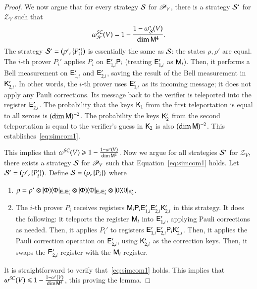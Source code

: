 \begin{proof}
	We now argue that for every strategy $\mathcal{S}$ for $\mathscr{P}_V$, there is a strategy $\mathcal{S}'$ for $\mathscr{Z}_V$ such that
	\begin{equation}
	\label{eq:simcom1}
		\omega^{SC}_{\strat'}(V) = 1 - \frac{1 - \omega^*_\strat(V)}{\dim \sM^4}.
	\end{equation}
	The strategy $\mathcal{S}' = (\rho',\{P_i'\})$ is essentially the same as $\mathcal{S}$: the states $\rho,\rho'$ are equal. The $i$-th prover $P_i'$ applies $P_i$ on ${\mathsf{E}}_{1,i}' {\mathsf{P}}_i$ (treating ${\mathsf{E}}_{1,i}'$ as ${\mathsf{M}}_i$). Then, it performs a Bell measurement on ${\mathsf{E}}_{1,i}'$ and ${\mathsf{E}}_{2,i}'$, saving the result of the Bell measurement in ${\mathsf{K}}_{2,i}'$. In other words, the $i$-th prover uses ${\mathsf{E}}_{1,i}'$ as its incoming message; it does not apply any Pauli corrections. Its message back to the verifier is teleported into the register ${\mathsf{E}}_{2,i}'$. The probability that the keys ${\mathsf{K}}_1$ from the first teleportation is equal to all zeroes is $(\dim {\mathsf{M}})^{-2}$. The probability the keys ${\mathsf{K}}_2'$ from the second teleportation is equal to the verifier's guess in ${\mathsf{K}}_2$ is also $(\dim {\mathsf{M}})^{-2}$. This establishes~\eqref{eq:simcom1}.
	
	This implies that $\omega^{SC}(V) \geqslant 1 - \frac{1 - \omega^*(V)}{\dim {\mathsf{M}}^4}$. Now we argue for all strategies $\mathcal{S}'$ for $\mathscr{Z}_{V}$, there exists a strategy $\mathcal{S}$ for $\mathscr{P}_V$ such that Equation~\eqref{eq:simcom1} holds. Let $\mathcal{S}' = (\rho',\{ P_i' \})$. Define $\mathcal{S} = (\rho,\{P_i\})$ where
	\begin{enumerate}
		\item $\rho = \rho' \otimes |\Phi\rangle\! \langle \Phi|_{{\mathsf{E}}_1 {\mathsf{E}}_1'} \otimes |\Phi\rangle\! \langle \Phi|_{{\mathsf{E}}_2 {\mathsf{E}}_2'} \otimes |0\rangle\! \langle 0|_{{\mathsf{K}}_2'}$. 
		
		\item The $i$-th prover $P_i$ receives registers ${\mathsf{M}}_i {\mathsf{P}}_i {\mathsf{E}}_{1,i}' {\mathsf{E}}_{2,i}' {\mathsf{K}}_{2,i}'$ in this strategy. It does the following: it teleports the register ${\mathsf{M}}_i$ into ${\mathsf{E}}_{1,i}'$, applying Pauli corrections as needed. Then, it applies $P_i'$ to registers ${\mathsf{E}}_{1,i}' {\mathsf{E}}_{2,i}' {\mathsf{P}}_i {\mathsf{K}}_{2,i}'$. Then, it applies the Pauli correction operation on ${\mathsf{E}}_{2,i}'$, using ${\mathsf{K}}_{2,i}'$ as the correction keys. Then, it swaps the ${\mathsf{E}}_{2,i}'$ register with the ${\mathsf{M}}_i$ register. 
	\end{enumerate}
	It is straightforward to verify that~\eqref{eq:simcom1} holds.  This implies that $\omega^{SC}(V) \leqslant 1 - \frac{1 - \omega^*(V)}{\dim {\mathsf{M}}^4}$, this proving the lemma.
\end{proof}


